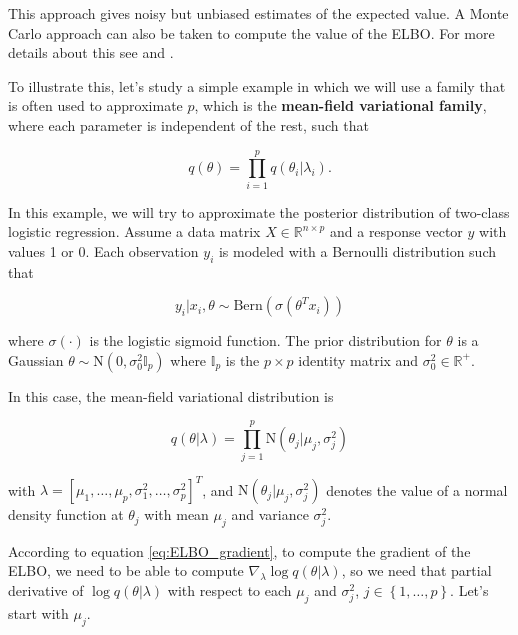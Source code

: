 This approach gives noisy but unbiased estimates of the expected value. A Monte Carlo approach can also be taken to compute the value of the ELBO. For more details about this see \cite{kucukelbir2017automatic} and \cite{ranganath2014black}.

To illustrate this, let's study a simple example in which we will use a family that is often used to approximate $p$, which is the \textbf{mean-field variational family}, where each parameter is independent of the rest, such that

$$
  q(\theta) = \prod_{i = 1}^p q(\theta_i | \lambda_i).
$$

In this example, we will try to approximate the posterior distribution of two-class logistic regression. Assume a data matrix $X \in \mathbb{R}^{n \times p}$ and a response vector $y$ with values 1 or 0. Each observation $y_i$ is modeled with a Bernoulli distribution such that

$$
  y_i | x_i, \theta \sim \mathrm{Bern}(\sigma(\theta^T x_i))
$$

where $\sigma(\cdot)$ is the logistic sigmoid function. The prior distribution for $\theta$ is a Gaussian $\theta \sim \mathrm{N}(0, \sigma_0^2 \mathbb{I}_p)$ where $\mathbb{I}_p$ is the $p \times p$ identity matrix and $\sigma_0^2 \in \mathbb{R}^+$.

In this case, the mean-field variational distribution is

\begin{equation}
  \label{eq:mean_field_normal_prior}
  q(\theta | \lambda) = \prod_{j = 1}^p \mathrm{N}(\theta_j | \mu_j, \sigma_j^2)
 \end{equation}

with $\lambda = \left[ \mu_1, \hdots, \mu_p, \sigma_1^2, \hdots, \sigma_p^2 \right]^T$, and $\mathrm{N}(\theta_j | \mu_j, \sigma_j^2)$ denotes the value of a normal density function at $\theta_j$ with mean $\mu_j$ and variance $\sigma_j^2$.

According to equation \ref{eq:ELBO_gradient}, to compute the gradient of the ELBO, we need to be able to compute $\nabla_{\lambda} \log q(\theta | \lambda)$, so we need that partial derivative of $\log q(\theta | \lambda)$ with respect to each $\mu_j$ and $\sigma_j^2$, $j \in \left\{ 1, \hdots, p \right\}$. Let's start with $\mu_j$.

